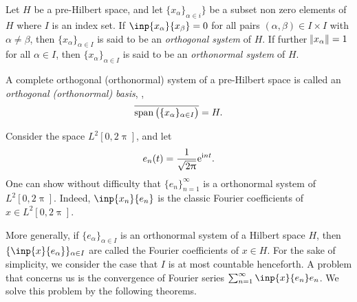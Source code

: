 \begin{defn}
Let $H$ be a pre-Hilbert space, and let $\{ x_\alpha \}_{\alpha \in i} \}$ 
be a subset non zero elements of $H$ where $I$ is an index set. 
If $\inp{x_\alpha}{x_\beta} = 0$ for all pairs $(\alpha, \beta) \in I 
\times I$ with $\alpha \neq \beta$, then $\{ x_\alpha \}_{\alpha \in I}$ 
is said to be an \emph{orthogonal system} of $H$. 
If further $\norm{x_\alpha} = 1$ for all $\alpha \in I$, then $\{x_\alpha\}
_{\alpha \in I}$ is said to be an \emph{orthonormal system} of $H$. 

A complete orthogonal (\resp orthonormal) system of a pre-Hilbert space is 
called an \emph{orthogonal (orthonormal) basis}, \ie, 
\begin{equation*}
    \overline{\operatorname{span}\left( \{x_\alpha\}_{\alpha \in I} \right)} = H.
\end{equation*}
\end{defn}

\begin{example}
Consider the space $L^2[0, 2\uppi]$, and let 
\begin{equation*}
    \begin{aligned}
        e_n(t) = \frac{1}{\sqrt{2 \uppi}} \mathrm{e} ^{\mathrm{i} n t}.
    \end{aligned}
\end{equation*}
One can show without difficulty that $\{ e_n \}_{n=1}^{\infty}$ is a 
orthonormal system of $L^2[0, 2 \uppi]$. 
Indeed, $\inp{x_n}{e_n}$ is the classic Fourier coefficients of $x \in
 L^2[0, 2\uppi]$.
\end{example}

More generally, if $\{e_\alpha\}_{\alpha \in I}$ is an orthonormal system of 
a Hilbert space $H$, then $\{\inp{x}{e_\alpha}\}_{\alpha \in I}$ are called 
the Fourier coefficients of $x \in H$. 
For the sake of simplicity, we consider the case that $I$ is at most 
countable henceforth. 
A problem that concerns us is the convergence of Fourier series 
$\sum_{n=1}^{\infty} \inp{x}{e_n} e_n$. 
We solve this problem by the following theorems. 

